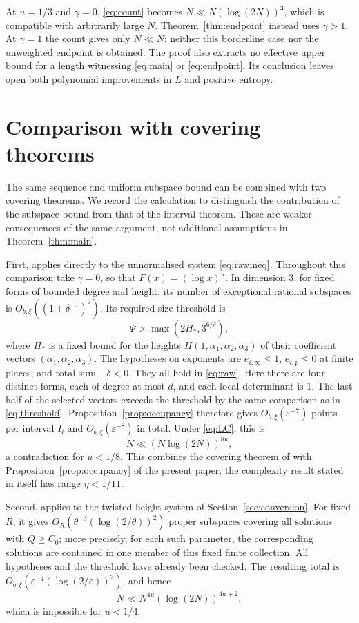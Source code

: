 \documentclass[11pt]{article}
\numberwithin{equation}{section}
\theoremstyle{remark}
\newcommand{\eps}{\varepsilon}
\begin{document}
At $u=1/3$ and $\gamma=0$, \eqref{eq:count} becomes
$N\ll N(\log(2N))^3$, which is compatible with arbitrarily large $N$.
Theorem~\ref{thm:endpoint} instead uses $\gamma>1$.
At $\gamma=1$ the count gives only $N\ll N$; neither this borderline
case nor the unweighted endpoint is obtained.
The proof also extracts no effective upper bound for a length
witnessing \eqref{eq:main} or \eqref{eq:endpoint}. Its conclusion leaves open both
polynomial improvements in $L$ and positive entropy.

\appendix
\section{Comparison with covering theorems}\label{app:covering}

The same sequence and uniform subspace bound can be combined with
two covering theorems. We record the calculation to distinguish
the contribution of the subspace bound from that of the interval
theorem. These are weaker consequences of the same argument,
not additional assumptions in Theorem~\ref{thm:main}.

First, \cite[Theorem~5.1]{BE08} applies directly to the unnormalised
system \eqref{eq:rawineq}. Throughout this comparison take $\gamma=0$,
so that $F(x)=(\log x)^u$. In dimension $3$, for fixed forms of bounded
degree and height, its number of exceptional rational subspaces is
$O_{b,\xi}((1+\delta^{-1})^7)$.
Its required size threshold is
\[
 \Psi>\max(2H_*,3^{6/\delta}),
\]
where $H_*$ is a fixed bound for the heights $H(1,\alpha_1,\alpha_2,\alpha_3)$
of their coefficient vectors $(\alpha_1,\alpha_2,\alpha_3)$.
The hypotheses on exponents are $e_{i,\infty}\le1$,
$e_{i,p}\le0$ at finite places, and total sum $-\delta<0$.
They all hold in \eqref{eq:raw}. Here there are four distinct forms,
each of degree at most $d$, and each local determinant is $1$.
The last half of the selected vectors exceeds the threshold by the
same comparison as in \eqref{eq:threshold}.
Proposition~\ref{prop:occupancy} therefore gives
$O_{b,\xi}(\eps^{-7})$ points per interval $I_l$ and
$O_{b,\xi}(\eps^{-8})$ in total. Under \eqref{eq:LC}, this is
\[
 N\ll(N\log(2N))^{8u},
\]
a contradiction for $u<1/8$.
This combines the covering theorem of \cite{BE08} with
Proposition~\ref{prop:occupancy} of the present paper; the complexity
result stated in \cite[Theorem~2.1]{BE08} itself has range $\eta<1/11$.

Second, \cite[Theorem~2.1]{EF13} applies to the twisted-height system
of Section~\ref{sec:conversion}. For fixed $R$, it gives
$O_R(\theta^{-3}(\log(2/\theta))^2)$ proper subspaces covering all
solutions with $Q\ge C_0$; more precisely, for each such parameter,
the corresponding solutions are contained in one member of this
fixed finite collection. All hypotheses and the threshold have
already been checked.
The resulting total is
$O_{b,\xi}(\eps^{-4}(\log(2/\eps))^2)$, and hence
\[
 N\ll N^{4u}(\log(2N))^{4u+2},
\]
which is impossible for $u<1/4$.
\end{document}

